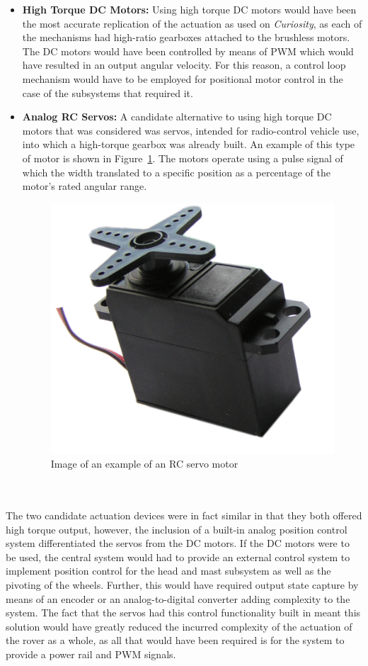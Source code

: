       \begin{itemize}
        \item \textbf{High Torque DC Motors:} Using high torque DC motors would have been the most accurate replication of the actuation as used on \textit{Curiosity}, as each of the mechanisms had high-ratio gearboxes attached to the brushless motors. The DC motors would have been controlled by means of PWM which would have resulted in an output angular velocity. For this reason, a control loop mechanism would have to be employed for positional motor control in the case of the subsystems that required it.
        \item \textbf{Analog RC Servos:} A candidate alternative to using high torque DC motors that was considered was servos, intended for radio-control vehicle use, into which a high-torque gearbox was already built. An example of this type of motor is shown in Figure~\ref{fig:concepts-servoMotorExample}. The motors operate using a pulse signal of which the width translated to a specific position as a percentage of the motor's rated angular range.
        
        \begin{figure}[H]
          \centering
          \includegraphics[width=0.3\linewidth]{figures/concepts-servoMotorExample}
          \caption[Image of an example of an RC servo motor]{Image of an example of an RC servo motor \cite{fig:concepts-servoMotorExample_cite}}
          \label{fig:concepts-servoMotorExample}
        \end{figure}

      \end{itemize}
      
      \\\\
        The two candidate actuation devices were in fact similar in that they both offered high torque output, however, the inclusion of a built-in analog position control system differentiated the servos from the DC motors. If the DC motors were to be used, the central system would had to provide an external control system to implement position control for the head and mast subsystem as well as the pivoting of the wheels. Further, this would have required output state capture by means of an encoder or an analog-to-digital converter adding complexity to the system. The fact that the servos had this control functionality built in meant this solution would have greatly reduced the incurred complexity of the actuation of the rover as a whole, as all that would have been required is for the system to provide a power rail and PWM signals.
        
